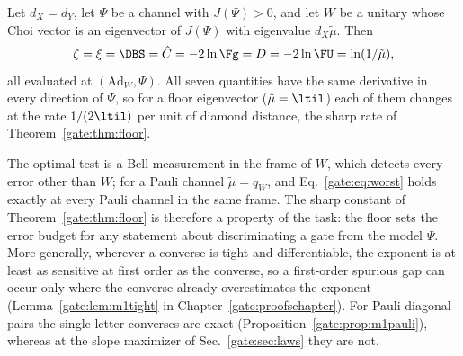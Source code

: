 \begin{proposition}\label{gate:prop:worst}
Let $d_X=d_Y$, let $\Psi$ be a channel with $J(\Psi)>0$, and let $W$ be a unitary whose Choi vector is an eigenvector of $J(\Psi)$ with eigenvalue $d_X\tilde\mu$. Then
\begin{equation}\label{gate:eq:worst}
\zeta=\xi=\DBS=\hat C=-2\ln\Fg=D=-2\ln\FU=\ln(1/\tilde\mu),
\end{equation}
all evaluated at $(\mathrm{Ad}_W,\Psi)$. All seven quantities have the same derivative in every direction of $\Psi$, so for a floor eigenvector ($\tilde\mu=\ltil$) each of them changes at the rate $1/(2\ltil)$ per unit of diamond distance, the sharp rate of Theorem~\ref{gate:thm:floor}.
\end{proposition}

The optimal test is a Bell measurement in the frame of $W$, which detects every error other than $W$; for a Pauli channel $\tilde\mu=q_W$, and Eq.~\eqref{gate:eq:worst} holds exactly at every Pauli channel in the same frame. The sharp constant of Theorem~\ref{gate:thm:floor} is therefore a property of the task: the floor sets the error budget for any statement about discriminating a gate from the model $\Psi$. More generally, wherever a converse is tight and differentiable, the exponent is at least as sensitive at first order as the converse, so a first-order spurious gap can occur only where the converse already overestimates the exponent (Lemma~\ref{gate:lem:m1tight} in Chapter~\ref{gate:proofschapter}). For Pauli-diagonal pairs the single-letter converses are exact (Proposition~\ref{gate:prop:m1pauli}), whereas at the slope maximizer of Sec.~\ref{gate:sec:laws} they are not.

